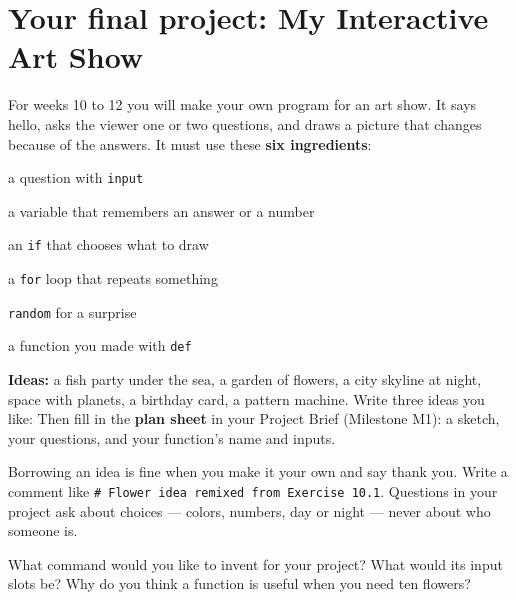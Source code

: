\section{Your final project: My Interactive Art Show}
For weeks 10 to 12 you will make your own program for an art show. It says hello, asks the viewer one or two questions, and draws a picture that changes because of the answers. It must use these \textbf{six ingredients}:
\begin{checklist}
  \item a question with \texttt{input}
  \item a variable that remembers an answer or a number
  \item an \texttt{if} that chooses what to draw
  \item a \texttt{for} loop that repeats something
  \item \texttt{random} for a surprise
  \item a function you made with \texttt{def}
\end{checklist}
\textbf{Ideas:} a fish party under the sea, a garden of flowers, a city skyline at night, space with planets, a birthday card, a pattern machine. Write three ideas you like:
Then fill in the \textbf{plan sheet} in your Project Brief (Milestone M1): a sketch, your questions, and your function's name and inputs.

\begin{tip}
Borrowing an idea is fine when you make it your own and say thank you. Write a comment like \texttt{\# Flower idea remixed from Exercise 10.1}. Questions in your project ask about choices --- colors, numbers, day or night --- never about who someone is.
\end{tip}

\begin{vocab}
\end{vocab}

\begin{reflection}
What command would you like to invent for your project? What would its input slots be?
Why do you think a function is useful when you need ten flowers?
\end{reflection}
